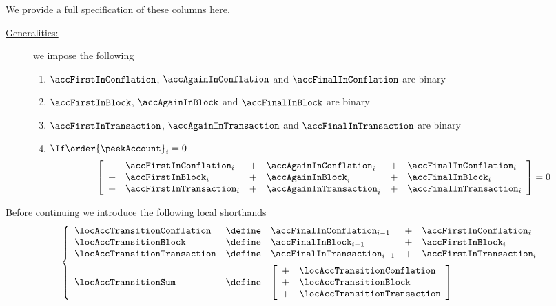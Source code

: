 We provide a full specification of these columns here.
\begin{description}
	\item[\underline{\underline{Generalities:}}]
		we impose the following
		\begin{enumerate}
			\item $\accFirstInConflation$,  $\accAgainInConflation$  and $\accFinalInConflation$  are binary
			\item $\accFirstInBlock$,       $\accAgainInBlock$       and $\accFinalInBlock$       are binary
			\item $\accFirstInTransaction$, $\accAgainInTransaction$ and $\accFinalInTransaction$ are binary
			\item $\If \order{\peekAccount} _{i} = 0$ \Then
				\[
					\left[ \begin{array}{clclcl}
						+ & \accFirstInConflation   _{i} & + & \accAgainInConflation   _{i} & + & \accFinalInConflation   _{i} \\
						+ & \accFirstInBlock        _{i} & + & \accAgainInBlock        _{i} & + & \accFinalInBlock        _{i} \\
						+ & \accFirstInTransaction  _{i} & + & \accAgainInTransaction  _{i} & + & \accFinalInTransaction  _{i} \\
					\end{array} \right]
					=
					0
				\]
		\end{enumerate}
\end{description}
Before continuing we introduce the following local shorthands
\[
	\left\{ \begin{array}{lclcl}
		\locAccTransitionConflation  & \define & \accFinalInConflation  _{i - 1} & + & \accFirstInConflation  _{i}              \\
		\locAccTransitionBlock       & \define & \accFinalInBlock       _{i - 1} & + & \accFirstInBlock       _{i}              \\
		\locAccTransitionTransaction & \define & \accFinalInTransaction _{i - 1} & + & \accFirstInTransaction _{i} \vspace{2mm} \\
		\locAccTransitionSum         & \define &
		\multicolumn{3}{l}{
		\left[ \begin{array}{cl}
			+ & \locAccTransitionConflation   \\
			+ & \locAccTransitionBlock        \\
			+ & \locAccTransitionTransaction  \\
		\end{array} \right] } \\
	\end{array} \right.
\]
